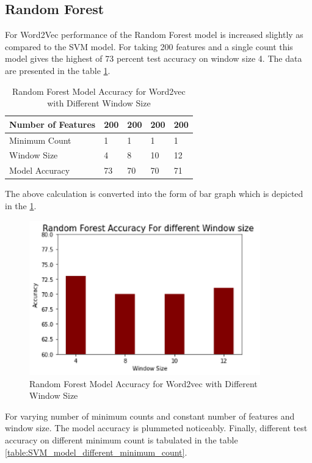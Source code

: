 \subsection{Random Forest}
For Word2Vec performance of the Random Forest model is increased slightly as compared to the SVM model. For taking 200 features and a single count this model gives the highest of 73 percent test accuracy on window size 4. The data are presented in the table \ref{table:Random_forest_word2vec_diff_window_size}.
\begin{center}
\begin{table}[H]
\caption{Random Forest Model Accuracy for Word2vec with Different Window Size}
\label{table:Random_forest_word2vec_diff_window_size}
\centering
\begin{tabular}{ |p{4cm}|p{2cm}|p{2cm}|p{2cm}|p{2cm}|  }
 \hline
 Number of Features & 200 &200 &200 &200  \\
 \hline
 Minimum Count   & 1 &1 &1 &1    \\
 \hline
 Window Size &4 &8 &10 &12 \\
 \hline
 Model Accuracy &73 &70 &70 &71 \\
 \hline
\end{tabular}
\end{table}
\end{center}
The above calculation is converted into the form of  bar graph which is depicted in the \ref{fig:Randomforest_acccuracy_different_windowsize}.
\begin{figure}[H]
	\centering 
	\vspace{20pt}\includegraphics[width=10cm]{images/Randomforest_acccuracy_different_windowsize.png}
	\caption{Random Forest Model Accuracy for Word2vec with Different Window Size} 
	\label{fig:Randomforest_acccuracy_different_windowsize}
\end{figure}
For varying number of minimum counts and constant number of features and window size. The model accuracy is plummeted noticeably. Finally, different test accuracy on different minimum count is tabulated in the table \ref{table:SVM_model_different_minimum_count}.
